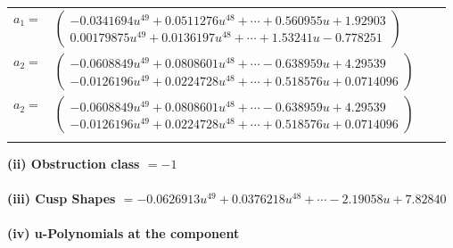 \documentclass[1p]{elsarticle_modified}
\theoremstyle{definition}
\begin{document}
\begin{tabular}{m{7pt} m{180pt} m{7pt} m{180pt} }
\flushright $a_{1}=$&$\begin{pmatrix}-0.0341694 u^{49}+0.0511276 u^{48}+\cdots+0.560955 u+1.92903\\0.00179875 u^{49}+0.0136197 u^{48}+\cdots+1.53241 u-0.778251\end{pmatrix}$ \\
\flushright $a_{2}=$&$\begin{pmatrix}-0.0608849 u^{49}+0.0808601 u^{48}+\cdots-0.638959 u+4.29539\\-0.0126196 u^{49}+0.0224728 u^{48}+\cdots+0.518576 u+0.0714096\end{pmatrix}$\\ \flushright $a_{2}=$&$\begin{pmatrix}-0.0608849 u^{49}+0.0808601 u^{48}+\cdots-0.638959 u+4.29539\\-0.0126196 u^{49}+0.0224728 u^{48}+\cdots+0.518576 u+0.0714096\end{pmatrix}$\\&\end{tabular}
\flushleft \textbf{(ii) Obstruction class $= -1$}\\~\\
\flushleft \textbf{(iii) Cusp Shapes $= -0.0626913 u^{49}+0.0376218 u^{48}+\cdots-2.19058 u+7.82840$}\\~\\
\newpage\renewcommand{\arraystretch}{1}
\flushleft \textbf{(iv) u-Polynomials at the component}\newline \\
\end{document}
